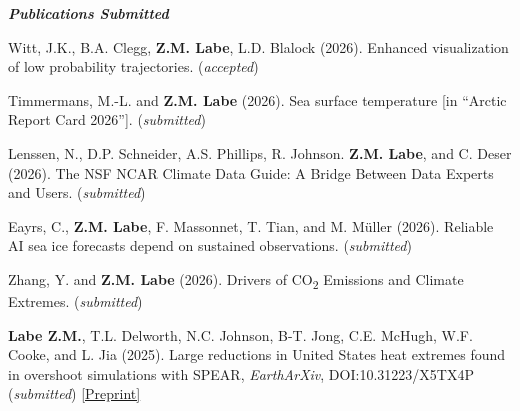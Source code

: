 \documentclass[margin,line,palatino,courier,10pt]{res}
\begin{document}
\begin{resume}
\textit{\textbf{Publications Submitted}}
\vspace*{-0.1in}\\
\begin{etaremune}[leftmargin=0in,topsep=0in,parsep=0in]
\item Witt, J.K., B.A. Clegg, \textbf{Z.M. Labe}, L.D. Blalock (2026). Enhanced visualization of low probability trajectories. (\textit{accepted})
\item Timmermans, M.-L. and \textbf{Z.M. Labe} (2026). Sea surface temperature [in ``Arctic Report Card 2026'']. (\textit{submitted})
\item Lenssen, N., D.P. Schneider, A.S. Phillips, R. Johnson. \textbf{Z.M. Labe}, and C. Deser (2026). The NSF NCAR Climate Data Guide: A Bridge Between Data Experts and Users. (\textit{submitted})
\item Eayrs, C., \textbf{Z.M. Labe}, F. Massonnet, T. Tian, and M. M\"uller (2026). Reliable AI sea ice forecasts depend on sustained observations. (\textit{submitted})
\item Zhang, Y. and \textbf{Z.M. Labe} (2026). Drivers of CO\textsubscript{2} Emissions and Climate Extremes. (\textit{submitted})
\item \textbf{Labe Z.M.}, T.L. Delworth, N.C. Johnson, B-T. Jong, C.E. McHugh, W.F. Cooke, and L. Jia (2025). Large reductions in United States heat extremes found in overshoot simulations with SPEAR, \textit{EarthArXiv}, DOI:10.31223/X5TX4P (\textit{submitted}) \href{https://doi.org/10.31223/X5TX4P}{[Preprint]}
\end{etaremune}



\end{resume}
\end{document}
